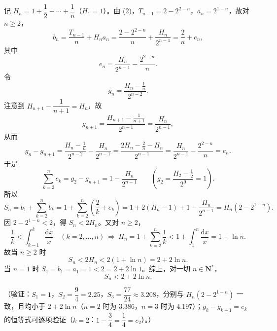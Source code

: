 \begin{answer}
记 \(H_n=1+\dfrac12+\cdots+\dfrac1n\)（\(H_1=1\)）。由 (2)，\(T_{n-1}=2-2^{2-n}\)，\(a_n=2^{1-n}\)，故对 \(n\geqslant2\)，
\nopagebreak[4]
\[
b_n=\frac{T_{n-1}}{n}+H_na_n
=\frac{2-2^{2-n}}{n}+\frac{H_n}{2^{n-1}}
=\frac2n+e_n,
\]
其中
\nopagebreak[4]
\[
e_n=\frac{H_n}{2^{n-1}}-\frac{2^{2-n}}{n}.
\]
令
\nopagebreak[4]
\[
g_n=\frac{H_n-\frac1n}{2^{n-2}}.
\]
注意到 \(H_{n+1}-\dfrac1{n+1}=H_n\)，故
\nopagebreak[4]
\[
g_{n+1}=\frac{H_{n+1}-\frac1{n+1}}{2^{n-1}}=\frac{H_n}{2^{n-1}},
\]
从而
\nopagebreak[4]
\[
g_n-g_{n+1}
=\frac{H_n-\frac1n}{2^{n-2}}-\frac{H_n}{2^{n-1}}
=\frac{2H_n-\frac2n-H_n}{2^{n-1}}
=\frac{H_n}{2^{n-1}}-\frac{2^{2-n}}{n}=e_n.
\]
于是
\nopagebreak[4]
\[
\sum_{k=2}^{n}e_k=g_2-g_{n+1}=1-\frac{H_n}{2^{n-1}}
\qquad\left(g_2=\frac{H_2-\frac12}{2^0}=1\right).
\]
所以
\nopagebreak[4]
\[
S_n=b_1+\sum_{k=2}^{n}b_k
=1+\sum_{k=2}^{n}\left(\frac2k+e_k\right)
=1+2(H_n-1)+1-\frac{H_n}{2^{n-1}}
=H_n\left(2-2^{1-n}\right).
\]
因 \(2-2^{1-n}<2\)，得 \(S_n<2H_n\)。又对 \(n\geqslant2\)，
\nopagebreak[4]
\[
\frac1k<\int_{k-1}^{k}\frac{\mathrm{d}x}{x}\quad(k=2,\dots,n)
\ \Longrightarrow\
H_n=1+\sum_{k=2}^{n}\frac1k<1+\int_1^n\frac{\mathrm{d}x}{x}=1+\ln n.
\]
故当 \(n\geqslant2\) 时
\nopagebreak[4]
\[
S_n<2H_n<2(1+\ln n)=2+2\ln n.
\]
当 \(n=1\) 时 \(S_1=b_1=a_1=1<2=2+2\ln1\)。综上，对一切 \(n\in\mathbf{N}^*\)，
\nopagebreak[4]
\[
S_n<2+2\ln n.
\]

（验证：\(S_1=1\)，\(S_2=\dfrac94=2.25\)，\(S_3=\dfrac{77}{24}\approx3.208\)，分别与 \(H_n(2-2^{1-n})\) 一致，且均小于 \(2+2\ln n\)（\(n=2\) 时为 \(3.386\)，\(n=3\) 时为 \(4.197\)）；\(g_k-g_{k+1}=e_k\) 的恒等式可逐项验证（\(k=2\)：\(1-\dfrac34=\dfrac14=e_2\)）。）




\end{answer}